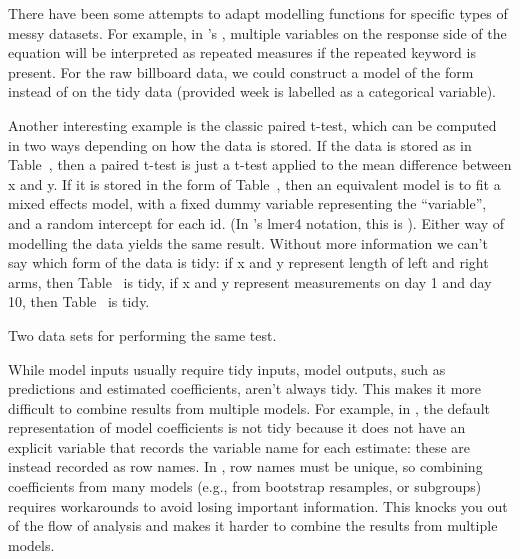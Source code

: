 \documentclass[article]{jss}
\begin{document}

There have been some attempts to adapt modelling functions for specific types of messy datasets. For example, in 's , multiple variables on the response side of the equation will be interpreted as repeated measures if the {\sc repeated} keyword is present. For the raw billboard data, we could construct a model of the form  instead of  on the tidy data (provided week is labelled as a categorical variable). 

Another interesting example is the classic paired t-test, which can be computed in two ways depending on how the data is stored. If the data is stored as in Table~, then a paired t-test is just a t-test applied to the mean difference between x and y. If it is stored in the form of Table~, then an equivalent model is to fit a mixed effects model, with a fixed dummy variable representing the ``variable'', and a random intercept for each id. (In 's lmer4 notation, this is ). Either way of modelling the data yields the same result. Without more information we can't say which form of the data is tidy: if x and y represent length of left and right arms, then Table~ is tidy, if x and y represent measurements on day 1 and day 10, then Table~ is tidy.

\begin{table}
  \centering
  \hspace{2em}%

  \caption{Two data sets for performing the same test.}
  \label{label}
\end{table}

While model inputs usually require tidy inputs, model outputs, such as predictions and estimated coefficients, aren't always tidy. This makes it more difficult to combine results from multiple models. For example, in , the default representation of model coefficients is not tidy because it does not have an explicit variable that records the variable name for each estimate: these are instead recorded as row names. In , row names must be unique, so combining coefficients from many models (e.g., from bootstrap resamples, or subgroups) requires workarounds to avoid losing important information.  This knocks you out of the flow of analysis and makes it harder to combine the results from multiple models.
\end{document}
